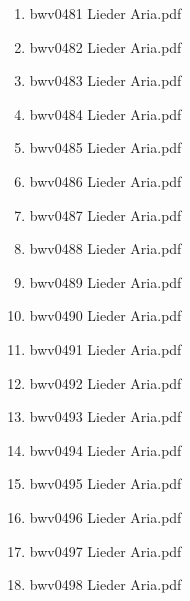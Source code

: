\documentclass[11pt]{article}
\begin{document}
\begin{enumerate}
\begin{enumerate}
\begin{enumerate}
\item bwv0481   Lieder Aria.pdf
\label{sec-1-1-1-1-44-6-7-4-43}

\item bwv0482   Lieder Aria.pdf
\label{sec-1-1-1-1-44-6-7-4-44}

\item bwv0483   Lieder Aria.pdf
\label{sec-1-1-1-1-44-6-7-4-45}

\item bwv0484   Lieder Aria.pdf
\label{sec-1-1-1-1-44-6-7-4-46}

\item bwv0485   Lieder Aria.pdf
\label{sec-1-1-1-1-44-6-7-4-47}

\item bwv0486   Lieder Aria.pdf
\label{sec-1-1-1-1-44-6-7-4-48}

\item bwv0487   Lieder Aria.pdf
\label{sec-1-1-1-1-44-6-7-4-49}

\item bwv0488   Lieder Aria.pdf
\label{sec-1-1-1-1-44-6-7-4-50}

\item bwv0489   Lieder Aria.pdf
\label{sec-1-1-1-1-44-6-7-4-51}

\item bwv0490   Lieder Aria.pdf
\label{sec-1-1-1-1-44-6-7-4-52}

\item bwv0491   Lieder Aria.pdf
\label{sec-1-1-1-1-44-6-7-4-53}

\item bwv0492   Lieder Aria.pdf
\label{sec-1-1-1-1-44-6-7-4-54}

\item bwv0493   Lieder Aria.pdf
\label{sec-1-1-1-1-44-6-7-4-55}

\item bwv0494   Lieder Aria.pdf
\label{sec-1-1-1-1-44-6-7-4-56}

\item bwv0495   Lieder Aria.pdf
\label{sec-1-1-1-1-44-6-7-4-57}

\item bwv0496   Lieder Aria.pdf
\label{sec-1-1-1-1-44-6-7-4-58}

\item bwv0497   Lieder Aria.pdf
\label{sec-1-1-1-1-44-6-7-4-59}

\item bwv0498   Lieder Aria.pdf
\label{sec-1-1-1-1-44-6-7-4-60}


\end{enumerate}
\end{enumerate}
\end{enumerate}
\end{document}
